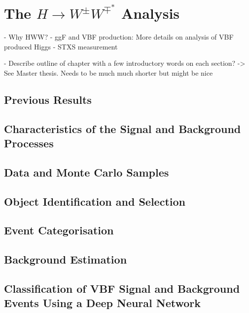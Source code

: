 \chapter{The $H\rightarrow W^{\pm}W^{\mp^*}$ Analysis}
\label{chap:hww}

- Why HWW?
- ggF and VBF production: More details on analysis of VBF produced Higgs
- STXS measurement

- Describe outline of chapter with a few introductory words on each section?
    -> See Master thesis. Needs to be much much shorter but might be nice


\section{Previous Results}
\label{sec:prev-results}



\section{Characteristics of the Signal and Background Processes}
\label{sec:signal-bkg-characteristics}



\section{Data and Monte Carlo Samples}
\label{sec:data-mc-samples}



\section{Object Identification and Selection}
\label{sec:object-selection}



\section{Event Categorisation}
\label{sec:event-categorisation}



\section{Background Estimation}
\label{sec:bkg-estimation}



\section{Classification of VBF Signal and Background Events Using a Deep Neural Network}
\label{sec:dnn}



